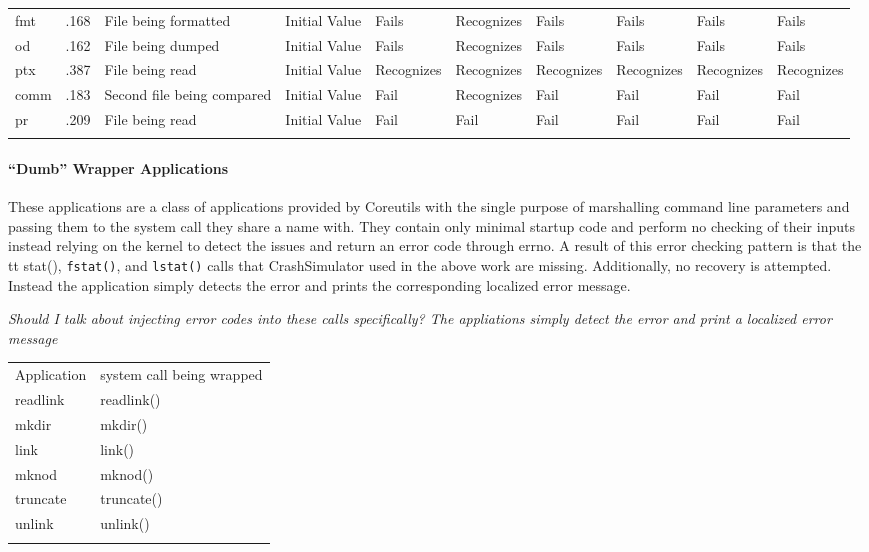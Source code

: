 \begin{table*}[t]
\begin{tabular}{l  l  l  l  l  l  l  l  l  l}
          fmt         & .168                             & File being formatted       & Initial Value  & Fails          & Recognizes  & Fails      & Fails       & Fails      & Fails\\
          od          & .162                             & File being dumped          & Initial Value  & Fails          & Recognizes  & Fails      & Fails       & Fails      & Fails\\
          ptx         & .387                             & File being read            & Initial Value  & Recognizes     & Recognizes  & Recognizes & Recognizes  & Recognizes & Recognizes\\
          comm        & .183                             & Second file being compared & Initial Value  & Fail           & Recognizes  & Fail       & Fail        & Fail       & Fail\\
          pr          & .209                             & File being read            & Initial Value  & Fail           & Fail        & Fail       & Fail        & Fail       & Fail\\
        \bottomrule{}
        \end{tabular}
    \end{table*}


\paragraph{``Dumb'' Wrapper Applications}

These applications are a class of applications provided by Coreutils with the single purpose of marshalling
command line parameters and passing them to the system call they share a name with.  They contain only minimal startup
code and perform no checking of their inputs instead relying on the kernel to detect the issues and return an error code
through errno.  A result of this error checking pattern is that the {\\tt stat()}, {\tt fstat()}, and {\tt lstat()}
calls that CrashSimulator used in the above work are missing.  Additionally, no recovery is attempted.  Instead the
application simply detects the error and prints the corresponding localized error message.

\emph{Should I talk about injecting error codes into these calls specifically?  The appliations simply detect the
  error and print a localized error message}

\begin{table*}[t]
  \scriptsize{}
  \begin{tabular}{l | l}
    Application  & system call being wrapped\\
    readlink     & readlink()\\
    mkdir        & mkdir()\\
    link         & link()\\
    mknod        & mknod()\\
    truncate     & truncate()\\
    unlink       & unlink()\\
  \bottomrule{}
  \end{tabular}
\end{table*}

